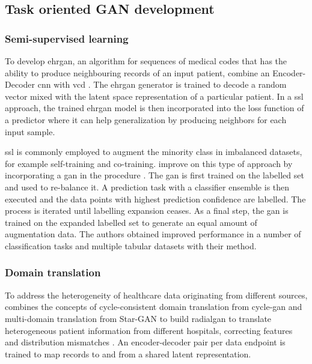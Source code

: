     \subsection{Task oriented GAN development}
        \subsubsection{Semi-supervised learning}

            To develop \gls{ehrgan}, an algorithm for sequences of medical codes that has the ability to produce neighbouring records of an input patient, \citeauthor{Che_2017} combine an Encoder-Decoder \gls{cnn} \cite{Rankin2020} with \gls{vcd} \cite{Che_2017}. The \gls{ehrgan} generator is trained to decode a random vector mixed with the latent space representation of a particular patient. In a \gls{ssl} approach, the trained \gls{ehrgan} model is then incorporated into the loss function of a predictor where it can help generalization by producing neighbors for each input sample.\par
            
            \Gls{ssl} is commonly employed to augment the minority class in imbalanced datasets, for example \gls{self-training} and \gls{co-training}. \citeauthor{yang2018unpaired} improve on this type of approach by incorporating a \gls{gan} in the procedure \cite{yang2018unpaired}. The \gls{gan} is first trained on the labelled set and used to re-balance it. A prediction task with a classifier ensemble is then executed and the data points with highest prediction confidence are labelled. The process is iterated until labelling expansion ceases. As a final step, the \gls{gan} is trained on the expanded labelled set to generate an equal amount of augmentation data. The authors obtained improved performance in a number of classification tasks and multiple tabular datasets with their method.
    
    \subsubsection{Domain translation}
    
        To address the heterogeneity of healthcare data originating from different sources, \citeauthor{Yoon2018-radial} combines the concepts of cycle-consistent domain translation  from \gls{cycle-gan} \cite{Zhu_2017} and multi-domain translation  from Star-GAN \cite{choi2017stargan} to build \gls{radialgan} to translate heterogeneous patient information from different hospitals, correcting features and distribution mismatches \cite{Yoon2018-radial}. An encoder-decoder pair per data endpoint is trained to map records to and from a shared latent representation. 
    
